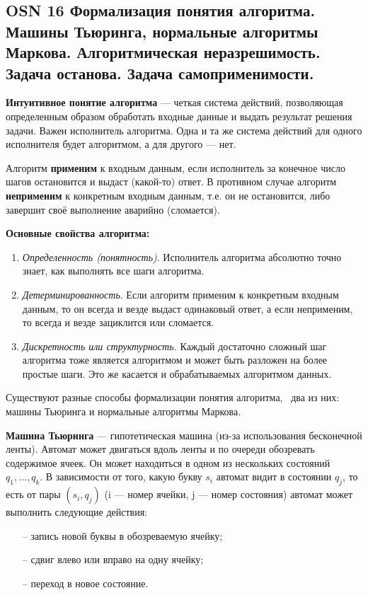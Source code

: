 \subsection*{OSN 16 Формализация понятия алгоритма. Машины Тьюринга, нормальные алгоритмы Маркова. Алгоритмическая неразрешимость. Задача останова. Задача самоприменимости.}


\textbf{Интуитивное понятие алгоритма} --- четкая система действий, позволяющая определенным образом обработать входные данные и выдать результат решения задачи. Важен исполнитель алгоритма. Одна и та же система действий для одного исполнителя будет алгоритмом, а для другого --- нет.

Алгоритм \textbf{применим} к входным данным, если исполнитель за конечное число шагов остановится и выдаст (какой-то) ответ. В противном случае алгоритм \textbf{неприменим} к конкретным входным данным, т.е. он не остановится, либо завершит своё выполнение аварийно (сломается).

\textbf{Основные свойства алгоритма:}
\begin{enumerate}
    \item\textit{Определенность (понятность)}. Исполнитель алгоритма абсолютно точно знает, как выполнять все шаги алгоритма.
    \item \textit{Детерминированность}. Если алгоритм применим к конкретным входным данным, то он всегда и везде выдаст одинаковый ответ, а если неприменим, то всегда и везде зациклится или сломается.
    \item \textit{Дискретность или структурность.} Каждый достаточно сложный шаг алгоритма тоже является алгоритмом и может быть разложен на более простые шаги. Это же касается и обрабатываемых алгоритмом данных.
\end{enumerate}

Существуют разные способы формализации понятия алгоритма, \faEye \ два из них: машины Тьюринга и нормальные алгоритмы Маркова.


\textbf{Машина Тьюринга} --- гипотетическая машина (из-за использования бесконечной ленты). Автомат может двигаться вдоль ленты и по очереди обозревать содержимое ячеек. Он может находиться в одном из нескольких состояний $q_1,\dots, q_k$. В зависимости от того, какую букву $s_i$ автомат видит в состоянии $q_j$, то есть от пары $(s_i,q_j)$ (i --- номер ячейки, j --- номер состояния) автомат может выполнить следующие действия:
\begin{itemize}
    \item[--] запись новой буквы в обозреваемую ячейку; 
    \item[--] сдвиг влево или вправо на одну ячейку;
    \item[--] переход в новое состояние.
\end{itemize}


